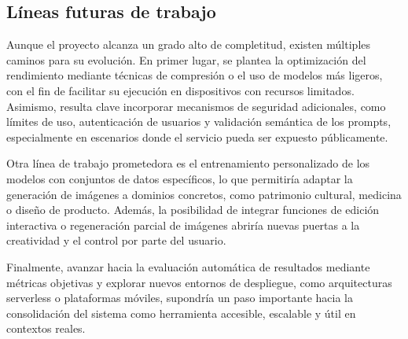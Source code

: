 \subsection{Líneas futuras de trabajo}

Aunque el proyecto alcanza un grado alto de completitud, existen múltiples caminos para su evolución. En primer lugar, se plantea la optimización del rendimiento mediante técnicas de compresión o el uso de modelos más ligeros, con el fin de facilitar su ejecución en dispositivos con recursos limitados. Asimismo, resulta clave incorporar mecanismos de seguridad adicionales, como límites de uso, autenticación de usuarios y validación semántica de los prompts, especialmente en escenarios donde el servicio pueda ser expuesto públicamente.

Otra línea de trabajo prometedora es el entrenamiento personalizado de los modelos con conjuntos de datos específicos, lo que permitiría adaptar la generación de imágenes a dominios concretos, como patrimonio cultural, medicina o diseño de producto. Además, la posibilidad de integrar funciones de edición interactiva o regeneración parcial de imágenes abriría nuevas puertas a la creatividad y el control por parte del usuario.

Finalmente, avanzar hacia la evaluación automática de resultados mediante métricas objetivas y explorar nuevos entornos de despliegue, como arquitecturas serverless o plataformas móviles, supondría un paso importante hacia la consolidación del sistema como herramienta accesible, escalable y útil en contextos reales.